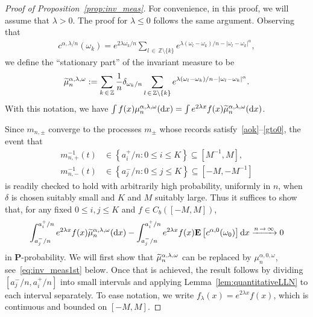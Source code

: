 \documentclass[AHL,Unicode,longabstracts,published]{cedram}
\newcommand{\Z}{\mathbb Z}
\newcommand{\bfP}{\mathbf{P}}
\newcommand{\bfE}{\mathbf{E}}
\newcommand{\dd}{\text{\upshape{d}}}
\let\oldtilde\tilde
\renewcommand*{\tilde}[1]{\mathchoice{\widetilde{#1}}{\widetilde{#1}}{\oldtilde{#1}}{\oldtilde{#1}}}
\begin{document}
\begin{proof}[Proof of Proposition~\ref{prop:inv_meas}]
For convenience, in this proof, we will assume that $\lambda>0$. The proof for $\lambda\leq 0$ follows the same argument. Observing that
\begin{align*}
c^{\alpha,\lambda/n}(\omega_k)=e^{2\lambda\omega_k/n}\sum_{l\,\in\,\Z\setminus\{k\}}e^{\lambda\left(\omega_l-\omega_k\right)/n-\left|\omega_l-\omega_k\right|^\alpha},
\end{align*}
we define the ``stationary part'' of the invariant measure to be
\begin{align*}
\tilde{\mu}^{\alpha,\lambda,\omega}_n:=\sum_{k\,\in\,\Z}\frac{1}{n}\delta_{\omega_k/n}\sum_{l\,\in\,\Z\setminus\{k\}}e^{\lambda(\omega_l-\omega_k)/n-|\omega_l-\omega_k|^\alpha}.
\end{align*}
With this notation, we have $\int f(x) \mu^{\alpha,\lambda,\omega}_n(\dd x)=\int e^{2\lambda x}f(x) \tilde{\mu}^{\alpha,\lambda,\omega}_n(\dd x)$.

Since $m_{n,\pm}$ converge to the processes $m_\pm$ whose records satisfy~\eqref{aok}--\eqref{gto0}, the event that
\begin{align*}
m_{n,+}^{-1}(t)&\in \left\{a_i^+/n\colon 0\le i \le K\right\} \subseteq \left[M^{-1}, M\right],\\
m_{n,-}^{-1}(t)&\in \left\{a_j^-/n\colon 0\le j \le K\right\} \subseteq \left[-M,-M^{-1}\right]
\end{align*}
is readily checked to hold with arbitrarily high probability, uniformly in $n$, when $\delta$ is chosen suitably small and $K$ and $M$ suitably large. Thus it suffices to show that, for any fixed $0\le i,j \le K$ and $f\in C_b([-M,M])$,
\begin{align}\label{eq:meas_goal}
\int_{a_j^-/n}^{a_i^+/n}e^{2\lambda x}f(x)\tilde{\mu}_n^{\alpha,\lambda,\omega}(\dd x)-
\int_{a_j^-/n}^{a_i^+/n}e^{2\lambda x}f(x)\bfE\left[c^{\alpha,0}(\omega_0)\right]\dd x \xrightarrow{n\,\to\,\infty} 0
\end{align}
in $\bfP$-probability. We will first show that $\tilde\mu_n^{\alpha,\lambda,\omega}$ can be replaced by $\mu_n^{\alpha,0,\omega}$, see~\eqref{eq:inv_meas1st} below. Once that is achieved, the result follows by dividing $[a_j^-/n,a_i^+/n]$ into small intervals and applying Lemma~\ref{lem:quantitativeLLN} to each interval separately. To ease notation, we write $f_\lambda(x)=e^{2\lambda x}f(x)$, which is continuous and bounded on $[-M,M]$.


\end{proof}
\end{document}
